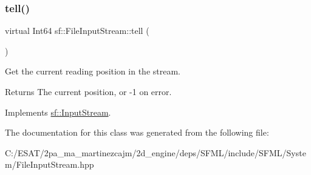 \subsubsection{\texorpdfstring{tell()}{tell()}}
{\footnotesize\ttfamily virtual Int64 sf\+::\+File\+Input\+Stream\+::tell (\begin{DoxyParamCaption}{ }\end{DoxyParamCaption})\hspace{0.3cm}{\ttfamily [virtual]}}



Get the current reading position in the stream. 

\begin{DoxyReturn}{Returns}
The current position, or -\/1 on error. 
\end{DoxyReturn}


Implements \hyperlink{classsf_1_1_input_stream_a599515b9ccdbddb6fef5a98424fd559c}{sf\+::\+Input\+Stream}.



The documentation for this class was generated from the following file\+:\begin{DoxyCompactItemize}
\item 
C\+:/\+E\+S\+A\+T/2pa\+\_\+ma\+\_\+martinezcajm/2d\+\_\+engine/deps/\+S\+F\+M\+L/include/\+S\+F\+M\+L/\+System/File\+Input\+Stream.\+hpp\end{DoxyCompactItemize}
